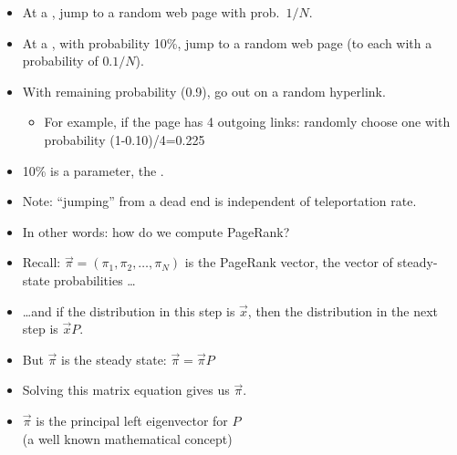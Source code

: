 \documentclass[a4paper,landscape,headrule,footrule,xetex]{foils}
\begin{document}
\begin{itemize}
\item At a , jump to a random web page with
  prob.\ $1/N$.
\item At a , with probability 10\%, jump to a
  random web page (to each with a probability of $0.1/N$).
\item With remaining probability (0.9), go out on a random
  hyperlink.
\begin{itemize}
 \item For example, if the page has 4 outgoing links:
   randomly choose one with probability (1-0.10)/4=0.225
\end{itemize}
\item 10\% is a parameter, the .
\item Note: ``jumping'' from a dead end is
independent of teleportation rate.
\end{itemize}


\begin{itemize}
\item In other words: how do we compute PageRank?
\item Recall:  $\vec{\pi} = (\pi_1,\pi_2,\ldots,\pi_N)$
is the PageRank vector, the vector of steady-state probabilities \ldots
\item \ldots and if the distribution in this step is 
 $\vec{x}$, then the distribution in the next step is
  $\vec{x} P$.
\item But $\vec{\pi}$ is the steady state: $\vec{\pi} = \vec{\pi} P$
\item Solving this matrix equation gives us $\vec{\pi}$.
\item $\vec{\pi}$ is the principal left eigenvector for $P$ 
  \\ (a well known mathematical concept)
\end{itemize}
\end{document}
